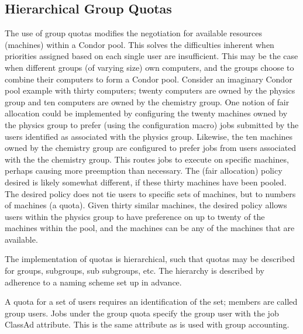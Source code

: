 \subsection{\label{sec:group-quotas}Hierarchical Group Quotas}

The use of group quotas modifies the negotiation for 
available resources (machines) within a Condor pool.
This solves the difficulties inherent when
priorities assigned based on each single user are insufficient.
This may be the case when
different groups (of varying size) own computers,
and the groups choose to combine their computers to
form a Condor pool.
Consider an imaginary Condor pool example with thirty computers;
twenty computers are owned by the physics group and ten
computers are owned by the chemistry group.
One notion of fair allocation could be implemented 
by configuring the twenty machines owned by the physics group
to prefer (using the  configuration macro)
jobs submitted by the users identified as associated
with the physics group.
Likewise, the ten machines owned by the chemistry group are
configured to prefer jobs from users associated with the
the chemistry group.
This routes jobs to execute on specific machines,
perhaps causing more preemption than necessary.
The (fair allocation) policy desired is likely somewhat different,
if these thirty machines have been pooled.
The desired policy does not tie users to specific sets of machines,
but to numbers of machines (a quota).
Given thirty similar machines,
the desired policy allows users within the physics group to have
preference on up to twenty of the machines within the pool,
and the machines can be any of the machines that are available.

The implementation of quotas is hierarchical,
such that quotas may be described for groups, subgroups,
sub subgroups, etc.  
The hierarchy is described by adherence to a naming scheme
set up in advance.

A quota for a set of users requires an identification of
the set; members are called group users.
Jobs under the group quota
specify the group user with the 
 job ClassAd attribute.
This is the same attribute as is used with group accounting.

